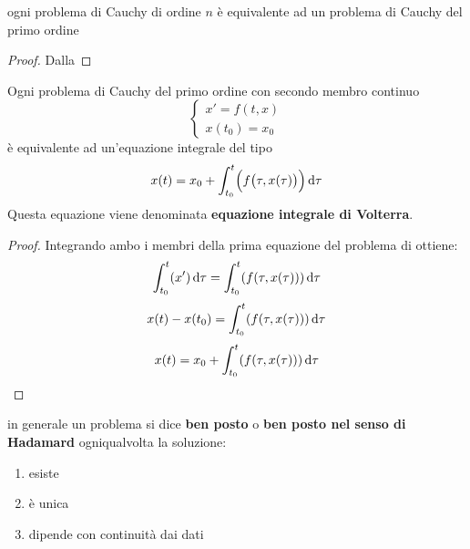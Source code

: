 \begin{proposition}
	ogni problema di Cauchy di ordine $n$ è equivalente ad un problema di Cauchy del primo ordine
	\begin{proof}
		Dalla 
	\end{proof}
\end{proposition}
\begin{definition}
	\label{def:equaz_volterra}
	Ogni problema di Cauchy del primo ordine con secondo membro continuo
	$$\begin{cases}x'=f(t,x)\\x(t_0)=x_0\end{cases}$$
	è equivalente ad un'equazione integrale del tipo
	$$x(t)=x_0+\int_{t_0}^{t}\Bigl(f\bigl(\tau,x(\tau)\bigr)\Bigr)\,\mathrm{d}{\tau}$$
	Questa equazione viene denominata \textbf{equazione integrale di Volterra}.
	\begin{proof}
		Integrando ambo i membri della prima equazione del problema di ottiene:
		$$\int_{t_0}^{t}( x')\,\mathrm{d}{\tau}=\int_{t_0}^{t}(f(\tau,x(\tau)))\,\mathrm{d}{\tau}$$
		$$x(t)-x(t_0)=\int_{t_0}^{t}(f(\tau,x(\tau)))\,\mathrm{d}{\tau}$$
		$$x(t)=x_0+\int_{t_0}^{t}(f(\tau,x(\tau)))\,\mathrm{d}{\tau}$$
	\end{proof}
\end{definition}

\begin{observation}
	\label{obs:hadamard}
	in generale un problema si dice \textbf{ben posto} o \textbf{ben posto nel senso di Hadamard} ogniqualvolta la soluzione:
	\begin{enumerate}
		\item esiste
		\item è unica
		\item dipende con continuità dai dati
	\end{enumerate}
\end{observation}

